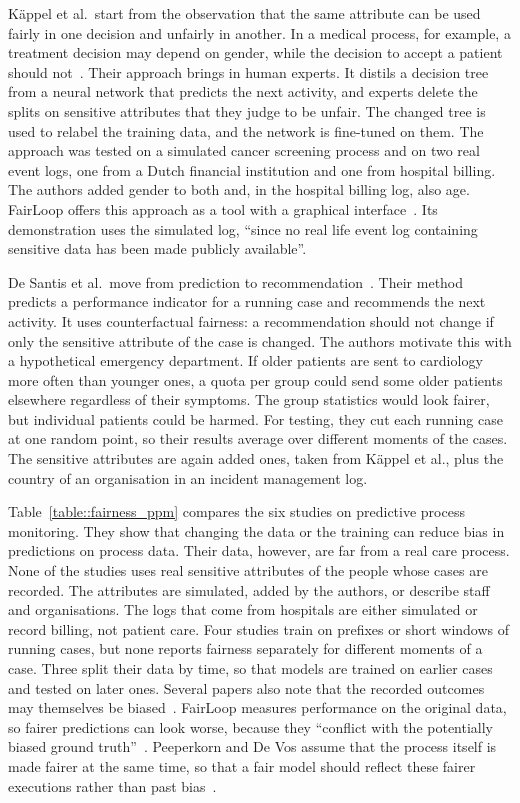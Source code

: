 Käppel et al.\ start from the observation that the same attribute can be used fairly in one decision and unfairly in another. In a medical process, for example, a treatment decision may depend on gender, while the decision to accept a patient should not~\cite{kappel2026human}. Their approach brings in human experts. It distils a decision tree from a neural network that predicts the next activity, and experts delete the splits on sensitive attributes that they judge to be unfair. The changed tree is used to relabel the training data, and the network is fine-tuned on them. The approach was tested on a simulated cancer screening process and on two real event logs, one from a Dutch financial institution and one from hospital billing. The authors added gender to both and, in the hospital billing log, also age. FairLoop offers this approach as a tool with a graphical interface~\cite{mohrlein2025fairloop}. Its demonstration uses the simulated log, \enquote{since no real life event log containing sensitive data has been made publicly available}.

De Santis et al.\ move from prediction to recommendation~\cite{desantis2027fairness}. Their method predicts a performance indicator for a running case and recommends the next activity. It uses counterfactual fairness: a recommendation should not change if only the sensitive attribute of the case is changed. The authors motivate this with a hypothetical emergency department. If older patients are sent to cardiology more often than younger ones, a quota per group could send some older patients elsewhere regardless of their symptoms. The group statistics would look fairer, but individual patients could be harmed. For testing, they cut each running case at one random point, so their results average over different moments of the cases. The sensitive attributes are again added ones, taken from Käppel et al., plus the country of an organisation in an incident management log.

Table~\ref{table::fairness_ppm} compares the six studies on predictive process monitoring. They show that changing the data or the training can reduce bias in predictions on process data. Their data, however, are far from a real care process. None of the studies uses real sensitive attributes of the people whose cases are recorded. The attributes are simulated, added by the authors, or describe staff and organisations. The logs that come from hospitals are either simulated or record billing, not patient care. Four studies train on prefixes or short windows of running cases, but none reports fairness separately for different moments of a case. Three split their data by time, so that models are trained on earlier cases and tested on later ones. Several papers also note that the recorded outcomes may themselves be biased~\cite{peeperkorn2025achieving,dasilva2025towards,kappel2026human,mohrlein2025fairloop}. FairLoop measures performance on the original data, so fairer predictions can look worse, because they \enquote{conflict with the potentially biased ground truth}~\cite{mohrlein2025fairloop}. Peeperkorn and De Vos assume that the process itself is made fairer at the same time, so that a fair model should reflect these fairer executions rather than past bias~\cite{peeperkorn2025achieving}.

